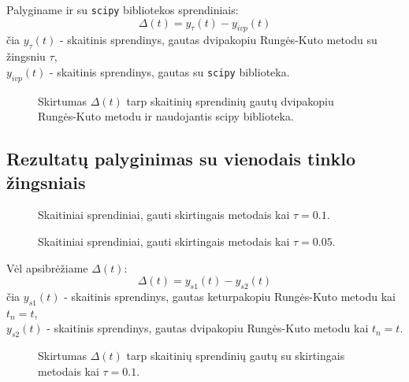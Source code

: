 \documentclass[]{VUMIFTemplateClass}
\newcommand{\tone}{0.1}
\newcommand{\ttwo}{0.05}
\begin{document}
Palyginame ir su \texttt{scipy} bibliotekos sprendiniais:\\
\[ \Delta(t) = y_{\tau}(t) - y_{ivp}(t) \]
čia $y_{\tau}(t)$ - skaitinis sprendinys, gautas dvipakopiu Rungės-Kuto metodu su žingsniu $\tau$,\\
$y_{ivp}(t)$ - skaitinis sprendinys, gautas su \texttt{scipy} biblioteka.
\begin{figure}[H]
    \begin{center}
        
    \end{center}
    \caption{Skirtumas $\Delta(t)$ tarp skaitinių sprendinių gautų dvipakopiu Rungės-Kuto metodu ir naudojantis scipy biblioteka.}
\end{figure}

\subsection{Rezultatų palyginimas su vienodais tinklo žingsniais}

\begin{figure}[H]
    \begin{center}
        
    \end{center}
    \caption{Skaitiniai sprendiniai, gauti skirtingais metodais kai $\tau = \tone$.}
\end{figure}

\begin{figure}[H]
    \begin{center}
        
    \end{center}
    \caption{Skaitiniai sprendiniai, gauti skirtingais metodais kai $\tau = \ttwo$.}
\end{figure}

Vėl apsibrėžiame $\Delta(t)$:\\
\[ \Delta(t) = y_{s1}(t) - y_{s2}(t) \]
čia $y_{s1}(t)$ - skaitinis sprendinys, gautas keturpakopiu Rungės-Kuto metodu kai $t_n = t$,\\
$y_{s2}(t)$ - skaitinis sprendinys, gautas dvipakopiu Rungės-Kuto metodu kai $t_n = t$.

\begin{figure}[H]
    \begin{center}
        
    \end{center}
    \caption{Skirtumas $\Delta(t)$ tarp skaitinių sprendinių gautų su skirtingais metodais kai $\tau = \tone$.}
\end{figure}
\end{document}
